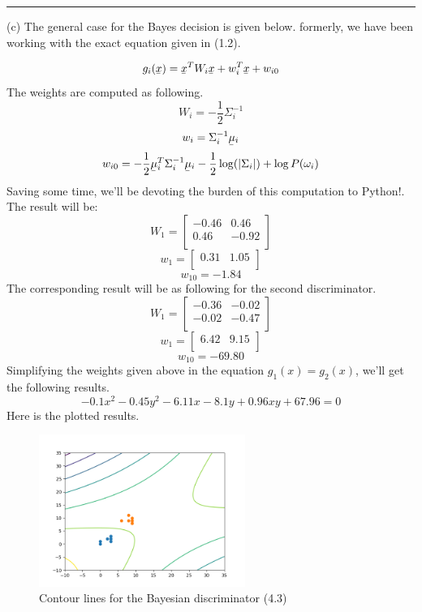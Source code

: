 \documentclass[12pt]{article}
\numberwithin{equation}{section}
\numberwithin{table}{section}
\numberwithin{figure}{section}
\begin{document}
\noindent\rule{\textwidth}{.5pt}
(c) The general case for the Bayes decision is given below. formerly, we have been working with the exact equation given in (1.2).

\begin{equation}
	g_i(\underaccent{\bar}{x}) = \underaccent{\bar}{x}^TW_i\underaccent{\bar}{x} + w_i^T\underaccent{\bar}{x} + w_{i0}
\end{equation}
The weights are computed as following.
$$
	W_i = -\frac{1}{2}\Sigma_i^{-1}
$$
$$
	w_i = \Sigma_i^{-1}\underaccent{\bar}{\mu}_i
$$
$$
	w_{i0} = -\frac{1}{2}\underaccent{\bar}{\mu}_i^T\Sigma_i^{-1}\underaccent{\bar}{\mu}_i - \frac{1}{2}\log(|\Sigma_i|) + \log P(\omega_i)
$$
Saving some time, we'll be devoting the burden of this computation to Python!. The result will be:
$$
	W_1 =  \begin{bmatrix}
	-0.46 & 0.46\\
	0.46 & -0.92\\
	\end{bmatrix}
$$
$$
	w_1 = \begin{bmatrix}
	0.31 & 1.05\\
	\end{bmatrix}
$$
$$
	w_{10} = -1.84
$$
The corresponding result will be as following for the second discriminator.
$$
	W_1 =  \begin{bmatrix}
	-0.36 & -0.02\\
	-0.02 & -0.47\\
	\end{bmatrix}
$$
$$
	w_1 = \begin{bmatrix}
	6.42 & 9.15\\
	\end{bmatrix}
$$
$$
	w_{10} = -69.80
$$
Simplifying the weights given above in the equation $g_1(x) = g_2(x)$, we'll get the following results.
\begin{equation}
	-0.1x^2 - 0.45y^2 - 6.11x - 8.1y + 0.96xy + 67.96= 0
\end{equation}
Here is the plotted results.
\begin{figure}[!h]\centering
	\includegraphics[width=0.6\textwidth]{4_3.png}
	\caption{Contour lines for the Bayesian discriminator (4.3)}
	\label{pl1}
\end{figure}
	
\end{document}
